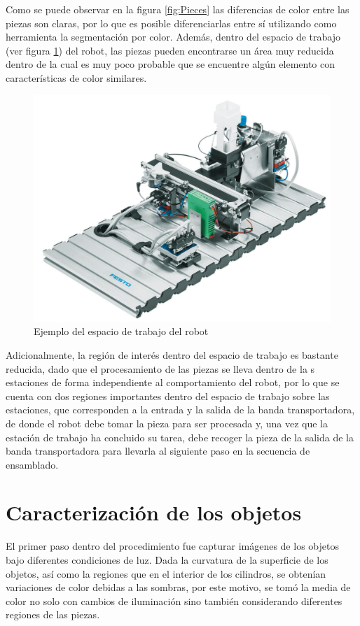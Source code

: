 Como se puede observar en la figura \ref{fig:Pieces} las diferencias de color entre las piezas son claras, por lo que es posible diferenciarlas entre sí utilizando como herramienta la segmentación por color. Además, dentro del espacio de trabajo (ver figura \ref{fig:EspaciodeTrabajo}) del robot, las piezas pueden encontrarse un área muy reducida dentro de la cual es muy poco probable que se encuentre algún elemento con características de color similares.

\begin{figure}[H]
\centering
\includegraphics[scale= 0.2]{Figures/BandaTrans_Big.png}
    \caption{Ejemplo del espacio de trabajo del robot}
    \label{fig:EspaciodeTrabajo}
\end{figure}

Adicionalmente, la región de interés dentro del espacio de trabajo es bastante reducida, dado que el procesamiento de las piezas se lleva dentro de la s estaciones de forma independiente al comportamiento del robot, por lo que se cuenta con dos regiones importantes dentro del espacio de trabajo sobre las estaciones, que corresponden a la entrada y la salida de la banda transportadora, de donde el robot debe tomar la pieza para ser procesada y, una vez que la estación de trabajo ha concluido su tarea, debe recoger la pieza de la salida de la banda transportadora para llevarla al siguiente paso en la secuencia de ensamblado.

\section{Caracterización de los objetos}
El primer paso dentro del procedimiento fue capturar imágenes de los objetos bajo diferentes condiciones de luz. Dada la curvatura de la superficie de los objetos, así como la regiones que en el interior de los cilindros, se obtenían variaciones de color debidas a las sombras, por este motivo, se tomó la media de color no solo con cambios de iluminación sino también considerando diferentes regiones de las piezas.

